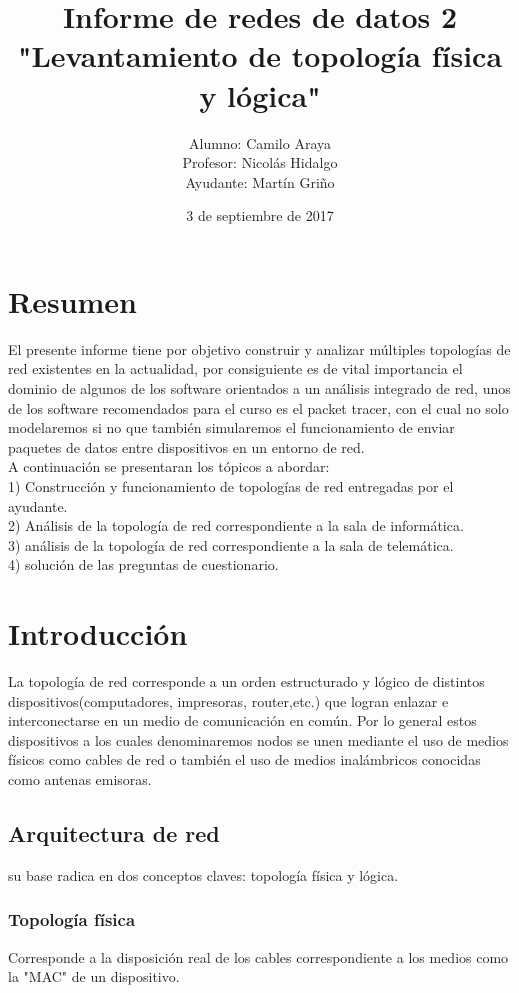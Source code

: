 \documentclass[spanish]{udpreport}
\title{Informe de redes de datos 2\\
"Levantamiento de topología física y lógica"\\}
\author{Alumno: Camilo Araya
\\Profesor: Nicolás Hidalgo\\Ayudante: Martín Griño}
\date{3 de septiembre de 2017}
\begin{document}
\maketitle

\chapter*{Resumen} 

El presente informe tiene por objetivo construir y analizar múltiples topologías de red existentes en la actualidad, por consiguiente es de vital importancia el dominio de algunos de los software orientados a un análisis integrado de red, unos de los software recomendados para el curso es el packet tracer, con el cual no solo modelaremos si no que también simularemos el funcionamiento de enviar paquetes de datos entre dispositivos en un entorno de red.
\\[0.5cm]
A continuación se presentaran los tópicos a abordar:
\\[0.5cm]
1) Construcción y funcionamiento de topologías de red entregadas por el ayudante.
\\[0.2cm]
2) Análisis de la topología de red correspondiente a la sala de informática.
\\[0.2cm]
3) análisis de la topología de red correspondiente a la sala de telemática.
\\[0.2cm]
4) solución de las preguntas de cuestionario.
\\[0.2cm]
\tableofcontents
\chapter{Introducción}
La topología de red corresponde a un orden estructurado y lógico de distintos dispositivos(computadores, impresoras, router,etc.) que logran enlazar e interconectarse en un medio de comunicación en común. Por lo general estos dispositivos a los cuales denominaremos nodos se unen mediante el uso de medios físicos como cables de red o también el uso de medios inalámbricos conocidas como antenas emisoras.
\section{Arquitectura de red}
su base radica en dos conceptos claves: topología física y lógica.
\subsection{Topología física}
Corresponde a la disposición real de los cables correspondiente a los medios como la "MAC" de un dispositivo.
\end{document}
